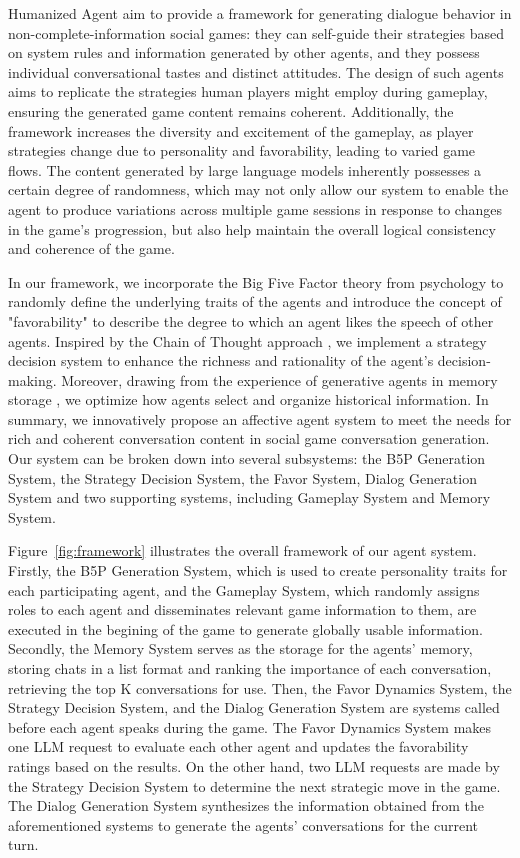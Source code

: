 \documentclass[11pt]{article}
\begin{document}
Humanized Agent aim to provide a framework for generating dialogue behavior in non-complete-information social games: they can self-guide their strategies based on system rules and information generated by other agents, and they possess individual conversational tastes and distinct attitudes. The design of such agents aims to replicate the strategies human players might employ during gameplay, ensuring the generated game content remains coherent. Additionally, the framework increases the diversity and excitement of the gameplay, as player strategies change due to personality and favorability, leading to varied game flows. The content generated by large language models inherently possesses a certain degree of randomness, which may not only allow our system to enable the agent to produce variations across multiple game sessions in response to changes in the game's progression, but also help maintain the overall logical consistency and coherence of the game.

In our framework, we incorporate the Big Five Factor theory from psychology to randomly define the underlying traits of the agents and introduce the concept of "favorability" to describe the degree to which an agent likes the speech of other agents. Inspired by the Chain of Thought approach \citep{wei2022chain}, we implement a strategy decision system to enhance the richness and rationality of the agent's decision-making. Moreover, drawing from the experience of generative agents in memory storage \citep{park2023generative}, we optimize how agents select and organize historical information. In summary, we innovatively propose an affective agent system to meet the needs for rich and coherent conversation content in social game conversation generation. Our system can be broken down into several subsystems: the B5P Generation System, the Strategy Decision System, the Favor System, Dialog Generation System and two supporting systems, including Gameplay System and Memory System.


Figure~\ref{fig:framework} illustrates the overall framework of our agent system. Firstly, the B5P Generation System, which is used to create personality traits for each participating agent, and the Gameplay System, which randomly assigns roles to each agent and disseminates relevant game information to them, are executed in the begining of the game to generate globally usable information.  Secondly, the Memory System serves as the storage for the agents' memory, storing chats in a list format and ranking the importance of each conversation, retrieving the top K conversations for use. Then, the Favor Dynamics System, the Strategy Decision System, and the Dialog Generation System are systems called before each agent speaks during the game. The Favor Dynamics System makes one LLM request to evaluate each other agent and updates the favorability ratings based on the results. On the other hand, two LLM requests are made by the Strategy Decision System  to determine the next strategic move in the game. The Dialog Generation System synthesizes the information obtained from the aforementioned systems to generate the agents' conversations for the current turn.
\end{document}

